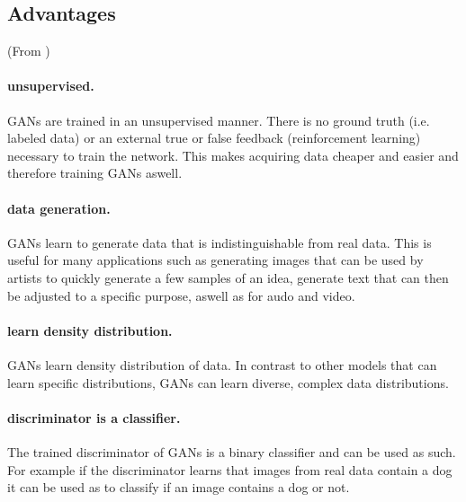 \newpage

\subsection{Advantages} (From \cite{GAN_Projects})
\paragraph{unsupervised.} GANs are trained in an unsupervised manner. There is no ground truth (i.e. labeled data) or an external true or false feedback (reinforcement learning) necessary to train the network. This makes acquiring data cheaper and easier and therefore training GANs aswell. 

\paragraph{data generation.} GANs learn to generate data that is indistinguishable from real data. This is useful for many applications such as generating images that can be used by artists to quickly generate a few samples of an idea, generate text that can then be adjusted to a specific purpose, aswell as for audo and video.

\paragraph{learn density distribution.} GANs learn density distribution of data. In contrast to other models that can learn specific distributions, GANs can learn diverse, complex data distributions.

\paragraph{discriminator is a classifier.} The trained discriminator of GANs is a binary classifier and can be used as such. For example if the discriminator learns that images from real data contain a dog it can be used as to classify if an image contains a dog or not. 